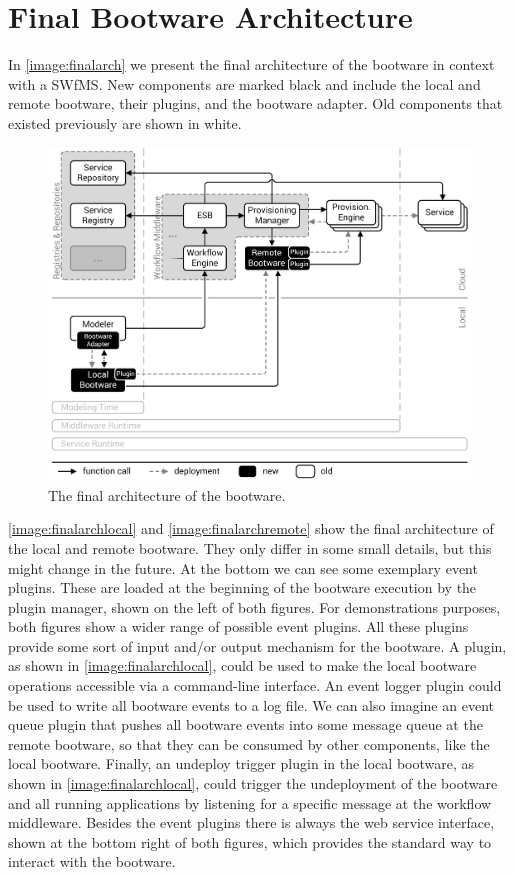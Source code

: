 \section{Final Bootware Architecture}
\label{design:finalarch}

In \autoref{image:finalarch} we present the final architecture of the bootware in context with a SWfMS.
New components are marked black and include the local and remote bootware, their plugins, and the bootware adapter.
Old components that existed previously are shown in white.

\begin{figure}[!htbp]
	\centering
	\includegraphics[resolution=600]{design/assets/final_architecture}
	\caption{The final architecture of the bootware.}
	\label{image:finalarch}
\end{figure}

\autoref{image:finalarchlocal} and \autoref{image:finalarchremote} show the final architecture of the local and remote bootware.
They only differ in some small details, but this might change in the future.
At the bottom we can see some exemplary event plugins.
These are loaded at the beginning of the bootware execution by the plugin manager, shown on the left of both figures.
For demonstrations purposes, both figures show a wider range of possible event plugins.
All these plugins provide some sort of input and/or output mechanism for the bootware.
A  plugin, as shown in \autoref{image:finalarchlocal}, could be used to make the local bootware operations accessible via a command-line interface.
An event logger plugin could be used to write all bootware events to a log file.
We can also imagine an event queue plugin that pushes all bootware events into some message queue at the remote bootware, so that they can be consumed by other components, like the local bootware.
Finally, an undeploy trigger plugin in the local bootware, as shown in \autoref{image:finalarchlocal}, could trigger the undeployment of the bootware and all running applications by listening for a specific message at the workflow middleware.
Besides the event plugins there is always the web service interface, shown at the bottom right of both figures, which provides the standard way to interact with the bootware.

